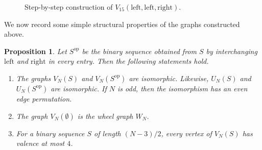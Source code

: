 \documentclass[11pt]{article}
\theoremstyle{definition}
\theoremstyle{plain}
\newtheorem{proposition}[definition]{Proposition}
\newcommand{\LeftChoice}{\mathrm{left}}
\newcommand{\RightChoice}{\mathrm{right}}
\begin{document}
\begin{figure}[H]
\centering
\begin{minipage}{0.19\linewidth}
\centering
\resizebox{\linewidth}{!}{}
\caption*{Seed}
\end{minipage}\hfill
\begin{minipage}{0.19\linewidth}
\centering
\resizebox{\linewidth}{!}{}
\caption*{After $s_1=\LeftChoice$}
\end{minipage}\hfill
\begin{minipage}{0.19\linewidth}
\centering
\resizebox{\linewidth}{!}{}
\caption*{After $s_2=\LeftChoice$}
\end{minipage}\hfill
\begin{minipage}{0.19\linewidth}
\centering
\resizebox{\linewidth}{!}{}
\caption*{After $s_3=\RightChoice$}
\end{minipage}\hfill
\begin{minipage}{0.19\linewidth}
\centering
\resizebox{\linewidth}{!}{}
\caption*{Close the arc}
\end{minipage}
\caption{Step-by-step construction of $V_{15}(\LeftChoice,\LeftChoice,\RightChoice)$.}
\label{fig:V15-construction}
\end{figure}

We now record some simple structural properties of the graphs constructed above.

\begin{proposition}\label{prop:VN-properties}
Let $S^{\mathrm{op}}$ be the binary sequence obtained from $S$ by interchanging $\LeftChoice$ and $\RightChoice$ in every entry.
Then the following statements hold.
\begin{enumerate}[itemsep=0.35em, topsep=0.35em]
\item \label{it:lr_iso} The graphs $V_N(S)$ and $V_N(S^{\mathrm{op}})$ are isomorphic. 
Likewise, $U_N(S)$ and $U_N(S^{\mathrm{op}})$ are isomorphic. 
If $N$ is odd, then the isomorphism has an even edge permutation.

\item \label{it:V_is_wheel} The graph $V_N(\emptyset)$ is the wheel graph $W_N$.

\item \label{it:V_low_valence} For a binary sequence $S$ of length $(N-3)/2$, every vertex of $V_N(S)$ has valence at most $4$.
\end{enumerate}
\end{proposition}
\end{document}
